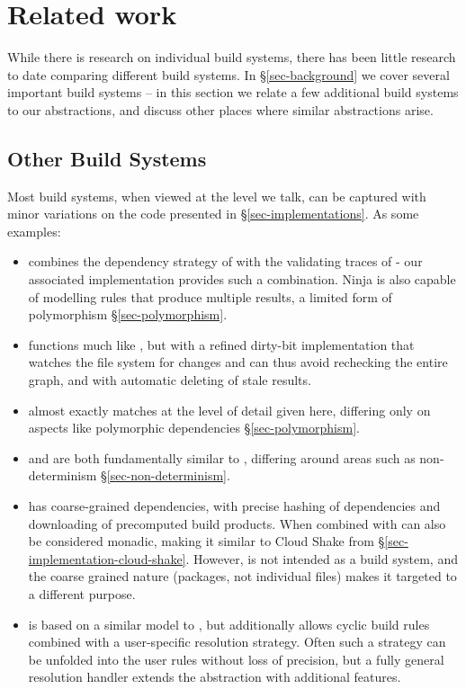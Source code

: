 \section{Related work}\label{sec-related}

While there is research on individual build systems, there has been little research to date comparing different build systems. In \S\ref{sec-background} we cover several important build systems -- in this section we relate a few additional build systems to our abstractions, and discuss other places where similar abstractions arise.

\subsection{Other Build Systems}\label{sec-related-build}

Most build systems, when viewed at the level we talk, can be captured with minor variations on the code presented in \S\ref{sec-implementations}. As some examples:

\begin{itemize}
\item \Ninja \cite{ninja} combines the dependency strategy of \Make with the validating traces of \Shake - our associated implementation provides such a combination. Ninja is also capable of modelling rules that produce multiple results, a limited form of polymorphism \S\ref{sec-polymorphism}.
\item \Tup \cite{tup} functions much like \Make, but with a refined dirty-bit implementation that watches the file system for changes and can thus avoid rechecking the entire graph, and with automatic deleting of stale results.
\item \Redo \cite{redo} almost exactly matches \Shake at the level of detail given here, differing only on aspects like polymorphic dependencies \S\ref{sec-polymorphism}.
\item \Buck \cite{buck} and \CloudBuild \cite{cloudbuild} are both fundamentally similar to \Bazel, differing around areas such as non-determinism \S\ref{sec-non-determinism}.
\item \Nix \cite{nix} has coarse-grained dependencies, with precise hashing of dependencies and downloading of precomputed build products. When combined with  \Nix can also be considered monadic, making it similar to Cloud Shake from \S\ref{sec-implementation-cloud-shake}.  However, \Nix is not intended as a build system, and the coarse grained nature (packages, not individual files) makes it targeted to a different purpose.
\item \Pluto \cite{pluto} is based on a similar model to \Shake, but additionally allows cyclic build rules combined with a user-specific resolution strategy. Often such a strategy can be unfolded into the user rules without loss of precision, but a fully general resolution handler extends the  abstraction with additional features.
\end{itemize}

